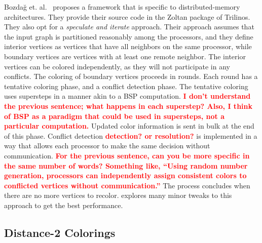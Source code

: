 \documentclass{article}
\newcommand{\todo}[1]{\textcolor{red}{\bf #1}}
\begin{document}
{{Bozda{\u{g}} et. al.~\cite{bozdaug2008framework} proposes a framework that is specific to 
distributed-memory architectures. They provide their source code in the Zoltan package of Trilinos.
They also opt for a {\it speculate and iterate} approach. Their approach assumes that the input graph
is partitioned reasonably among the processors, and they define interior vertices as vertices that have
all neighbors on the same processor, while boundary vertices are vertices with at least one remote 
neighbor. The interior vertices can be colored independently, as they will not participate in any 
conflicts. The coloring of boundary vertices proceeds in rounds. Each round has a tentative coloring
phase, and a conflict detection phase. The tentative coloring uses supersteps in a manner akin to a BSP
computation. \todo{I don't understand the previous sentence; what happens in each superstep?  Also, I think of BSP as a paradigm that could be used in supersteps, not a particular computation.} Updated color information is sent in bulk at the end of this phase. Conflict detection \todo{detection? or resolution?} is
implemented in a way  that allows each processor to make the same decision without communication. \todo{For the previous sentence, can you be more specific in the same number of words? Something like, ``Using random number 
generation, processors can independently assign consistent colors to conflicted
vertices without communication.''} The 
process concludes when there are no more vertices to recolor. \cite{bozdaug2008framework} explores 
many minor tweaks to this approach to get the best performance.

\subsection{Distance-2 Colorings}

}}
\end{document}
